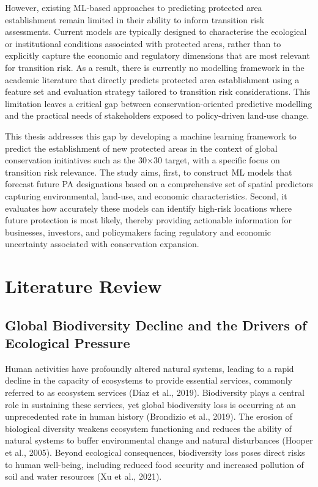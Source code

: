 \documentclass[12pt]{article}
\theoremstyle{break} %
\begin{document}
However, existing ML-based approaches to predicting protected area establishment remain limited in their ability to inform transition risk assessments. Current models are typically designed to characterise the ecological or institutional conditions associated with protected areas, rather than to explicitly capture the economic and regulatory dimensions that are most relevant for transition risk. As a result, there is currently no modelling framework in the academic literature that directly predicts protected area establishment using a feature set and evaluation strategy tailored to transition risk considerations. This limitation leaves a critical gap between conservation-oriented predictive modelling and the practical needs of stakeholders exposed to policy-driven land-use change.

This thesis addresses this gap by developing a machine learning framework to predict the establishment of new protected areas in the context of global conservation initiatives such as the 30×30 target, with a specific focus on transition risk relevance. The study aims, first, to construct ML models that forecast future PA designations based on a comprehensive set of spatial predictors capturing environmental, land-use, and economic characteristics. Second, it evaluates how accurately these models can identify high-risk locations where future protection is most likely, thereby providing actionable information for businesses, investors, and policymakers facing regulatory and economic uncertainty associated with conservation expansion.
\newpage 

\section{Literature Review}\label{literature-review}

\subsection{Global Biodiversity Decline and the Drivers of Ecological Pressure} \label{biodiversity-decline}

Human activities have profoundly altered natural systems, leading to a rapid decline in the capacity of ecosystems to provide essential services, commonly referred to as ecosystem services (Díaz et al., 2019). Biodiversity plays a central role in sustaining these services, yet global biodiversity loss is occurring at an unprecedented rate in human history (Brondizio et al., 2019). The erosion of biological diversity weakens ecosystem functioning and reduces the ability of natural systems to buffer environmental change and natural disturbances (Hooper et al., 2005). Beyond ecological consequences, biodiversity loss poses direct risks to human well-being, including reduced food security and increased pollution of soil and water resources (Xu et al., 2021).
\end{document}
